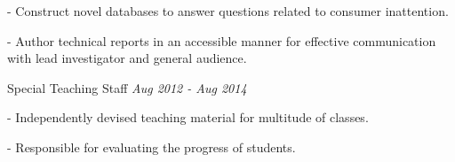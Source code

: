 \documentclass{article}
\begin{document}
- Construct novel databases to answer questions related to consumer inattention.

- Author technical reports in an accessible manner for effective communication with lead investigator and general audience.







\vspace{0.05cm}
\noindent Special Teaching Staff \hfill \emph{Aug 2012 - Aug 2014}

- Independently devised teaching material for multitude of classes.

- Responsible for evaluating the progress of students.


\end{document}
